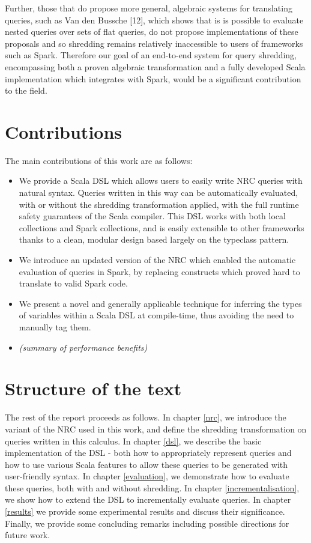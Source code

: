 {{Further, those that do propose more general, algebraic systems for translating queries, such as Van den Bussche [12], which shows that is is possible to evaluate nested queries over sets of flat queries, do not propose implementations of these proposals and so shredding remains relatively inaccessible to users of frameworks such as Spark. Therefore our goal of an end-to-end system for query shredding, encompassing both a proven algebraic transformation and a fully developed Scala implementation which integrates with Spark, would be a significant contribution to the field.		
}



}


\section{Contributions} {
The main contributions of this work are as follows:

\begin{itemize}
\item{We provide a Scala DSL which allows users to easily write NRC queries with natural syntax. Queries written in this way can be automatically evaluated, with or without the shredding transformation applied, with the full runtime safety guarantees of the Scala compiler. This DSL works with both local collections and Spark collections, and is easily extensible to other frameworks thanks to a clean, modular design based largely on the typeclass pattern.}
\item{We introduce an updated version of the NRC which enabled the automatic evaluation of queries in Spark, by replacing constructs which proved hard to translate to valid Spark code.}
\item{We present a novel and generally applicable technique for inferring the types of variables within a Scala DSL at compile-time, thus avoiding the need to manually tag them. }
\item{\textit{(summary of performance benefits)}}
\end{itemize}
}

\section{Structure of the text} {
The rest of the report proceeds as follows. In chapter \ref{nrc}, we introduce the variant of the NRC used in this work, and define the shredding transformation on queries written in this calculus. In chapter \ref{dsl}, we describe the basic implementation of the DSL - both how to appropriately represent queries and how to use various Scala features to allow these queries to be generated with user-friendly syntax. In chapter \ref{evaluation}, we demonstrate how to evaluate these queries, both with and without shredding.  In chapter \ref{incrementalisation}, we show how to extend the DSL to incrementally evaluate queries. In chapter \ref{results} we provide some experimental results and discuss their significance. Finally, we provide some concluding remarks including possible directions for future work.
}
